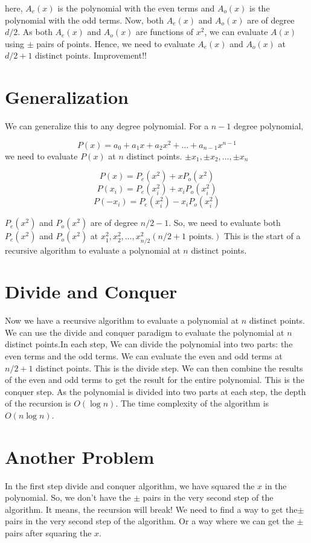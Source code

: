 \documentclass{report}
\begin{document}
here, \(A_e(x)\) is the polynomial with the even terms and \(A_o(x)\) is the polynomial with the odd terms. Now, both \(A_e(x)\) and \(A_o(x)\) are of degree \(d/2\). 
As both $A_e(x)$ and $A_o(x)$ are functions of $x^2$, we can evaluate \(A(x)\) using $\pm$ pairs of points. Hence, we need to evaluate \(A_e(x)\) and \(A_o(x)\) at \(d/2 + 1\) distinct points. Improvement!!

\section{Generalization}
We can generalize this to any degree polynomial.
For a \(n-1\) degree polynomial, 

$$	P(x) = a_0 + a_1x + a_2x^2 + \ldots + a_{n-1}x^{n-1} $$
we need to evaluate \(P(x)\) at \(n\) distinct points. $\pm x_1,\pm x_2, \ldots, \pm x_n $

$$ P(x) = P_e(x^2) + xP_o(x^2)$$
$$ P(x_i) = P_e(x_i^2) + x_iP_o(x_i^2)$$
 $$P(-x_i) = P_e(x_i^2) - x_iP_o(x_i^2)$$

\(P_e(x^2)\) and \(P_o(x^2)\) are of degree \(n/2-1\).\newline
So, we need to evaluate both \(P_e(x^2)\) and \(P_o(x^2)\) at $ x_1^2, x_2^2, \ldots, x_{n/2}^2 (n/2 + 1 \text{ points.})$ \newline
This is the start of a recursive algorithm to evaluate a polynomial at \(n\) distinct points.

\section{Divide and Conquer}
Now we have a recursive algorithm to evaluate a polynomial at \(n\) distinct points. We can use the divide and conquer paradigm to evaluate the polynomial at \(n\) distinct points.In each step, We can divide the polynomial into two parts: the even terms and the odd terms. We can evaluate the even and odd terms at \(n/2 + 1\) distinct points. This is the divide step. We can then combine the results of the even and odd terms to get the result for the entire polynomial. This is the conquer step. As the polynomial is divided into two parts at each step, the depth of the recursion is \(O(\log n)\). The time complexity of the algorithm is \(O(n \log n)\).

\section{Another Problem}
In the first step divide and conquer algorithm, we have squared the $x$ in the polynomial. So, we don't have the $\pm$ pairs in the very second step of the algorithm. It means, the recursion will break! We need to find a way to get the$ \pm $ pairs in the very second step of the algorithm. Or a way where we can get the $\pm $pairs after squaring the \(x\).
\end{document}
